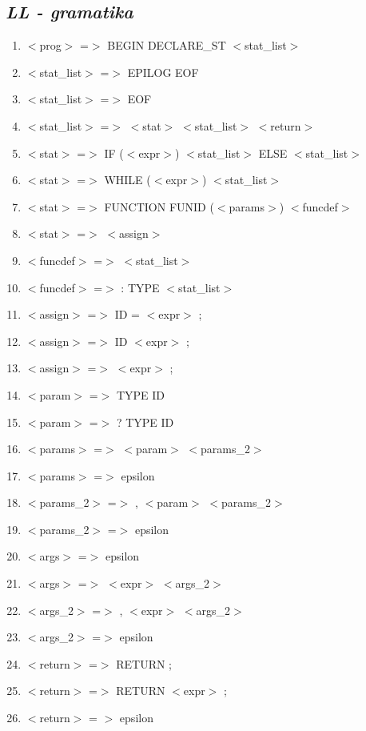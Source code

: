 \documentclass{article}
\begin{document}
\subsection{\emph{LL - gramatika}}
    
\begin{enumerate}
    \item $<$prog$>$ =$>$ BEGIN DECLARE\_ST $<$stat\_list$>$
    \item $<$stat\_list$>$ =$>$ EPILOG EOF
    \item $<$stat\_list$>$ =$>$ EOF
    \item $<$stat\_list$>$ =$>$ $<$stat$>$ $<$stat\_list$>$ $<$return$>$
    \item $<$stat$>$ =$>$ IF ($<$expr$>$) {$<$stat\_list$>$} ELSE {$<$stat\_list$>$}
    \item $<$stat$>$ =$>$ WHILE ($<$expr$>$) {$<$stat\_list$>$}
    \item $<$stat$>$ =$>$ FUNCTION FUNID ($<$params$>$) $<$funcdef$>$
    \item $<$stat$>$ =$>$ $<$assign$>$
    \item $<$funcdef$>$ =$>$ {$<$stat\_list$>$}
    \item $<$funcdef$>$ =$>$ : TYPE {$<$stat\_list$>$}
    \item $<$assign$>$ =$>$ ID = $<$expr$>$ ;
    \item $<$assign$>$ =$>$ ID $<$expr$>$ ;
    \item $<$assign$>$ =$>$ $<$expr$>$ ;
    \item $<$param$>$ =$>$ TYPE ID
    \item $<$param$>$ =$>$ ? TYPE ID
    \item $<$params$>$ =$>$ $<$param$>$ $<$params\_2$>$ 
    \item $<$params$>$ =$>$ epsilon
    \item $<$params\_2$>$ =$>$ , $<$param$>$ $<$params\_2$>$ 
    \item $<$params\_2$>$ =$>$ epsilon
    \item $<$args$>$ =$>$ epsilon
    \item $<$args$>$ =$>$ $<$expr$>$ $<$args\_2$>$
    \item $<$args\_2$>$ =$>$ , $<$expr$>$ $<$args\_2$>$
    \item $<$args\_2$>$ =$>$ epsilon
    \item $<$return$>$ =$>$ RETURN ;
    \item $<$return$>$ =$>$ RETURN $<$expr$>$ ;
    \item $<$return$>$ = $>$ epsilon
\end{enumerate}
\end{document}

